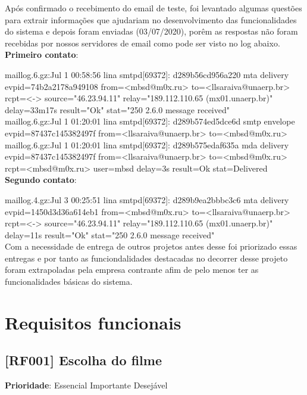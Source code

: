 \documentclass[12pt,a4paper]{article}
\let\oldsection\section
\renewcommand\section{\clearpage\oldsection}
\begin{document}
Após confirmado o recebimento do email de teste, foi levantado algumas questões
para extrair informações que ajudariam no desenvolvimento das funcionalidades do 
sistema e depois foram enviadas (03/07/2020), porêm as respostas não foram recebidas 
por nossos servidores de email como pode ser visto no log abaixo.\\


\textbf{Primeiro contato}:


maillog.6.gz:Jul  1 00:58:56 lina smtpd[69372]: d289b56cd956a220 mta delivery evpid=74b2a2178a949108 from=<mbsd@m0x.ru> to=<llsaraiva@unaerp.br> rcpt=<-> source="46.23.94.11" relay="189.112.110.65 (mx01.unaerp.br)" delay=33m17s result="Ok" stat="250 2.6.0 message received"\\
maillog.6.gz:Jul  1 01:20:01 lina smtpd[69372]: d289b574ed5dce6d smtp envelope evpid=87437c145382497f from=<llsaraiva@unaerp.br> to=<mbsd@m0x.ru>\\
maillog.6.gz:Jul  1 01:20:01 lina smtpd[69372]: d289b575edaf635a mda delivery evpid=87437c145382497f from=<llsaraiva@unaerp.br> to=<mbsd@m0x.ru> rcpt=<mbsd@m0x.ru> user=mbsd delay=3s result=Ok stat=Delivered\\


\textbf{Segundo contato}:


maillog.4.gz:Jul  3 00:25:51 lina smtpd[69372]: d289b9ea2bbbc3c6 mta delivery evpid=1450d3d36a614eb1 from=<mbsd@m0x.ru> to=<llsaraiva@unaerp.br> rcpt=<-> source="46.23.94.11" relay="189.112.110.65 (mx01.unaerp.br)" delay=11s result="Ok" stat="250 2.6.0 message received"\\


Com a necessidade de entrega de outros projetos antes desse foi priorizado essas
entregas e por tanto as funciondalidades destacadas no decorrer desse projeto
foram extrapoladas pela empresa contrante afim de pelo menos ter as funcionalidades
básicas do sistema.

\section{Requisitos funcionais}
\subsection{[RF001] Escolha do filme}

\textbf{Prioridade}:
\mbox{\ooalign{$\checkmark$\cr\hidewidth$\square$\hidewidth\cr}} Essencial
\mbox{\ooalign{\cr\hidewidth$\square$\hidewidth\cr}} Importante
\mbox{\ooalign{\cr\hidewidth$\square$\hidewidth\cr}} Desejável
\end{document}
